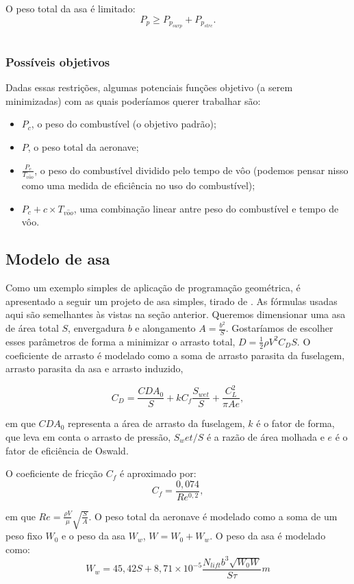 O peso total da asa é limitado:
\[
  P_p \geq P_{p_{surp}} + P_{p_{strc}}.
\]

\inputminted{python}{../Exemplos/Cap15/prog4_wwb.py}

\subsubsection{Possíveis objetivos}

Dadas essas restrições, algumas potenciais funções objetivo (a serem
minimizadas) com as quais poderíamos querer trabalhar são:

\begin{itemize}
\item $P_c$, o peso do combustível (o objetivo padrão);
\item $P$, o peso total da aeronave;
\item $\frac{P_c}{T_{v\hat{o}o}}$, o peso do combustível dividido pelo
  tempo de vôo (podemos pensar nisso como uma medida de eficiência no
  uso do combustível);
\item $P_c + c \times T_{v\hat{o}o}$, uma combinação linear antre peso
  do combustível e tempo de vôo.
\end{itemize}

\subsection{Modelo de asa}
Como um exemplo simples de aplicação de programação geométrica, é
apresentado a seguir um projeto de asa simples, tirado de
\cite{warren}. As fórmulas usadas aqui são semelhantes às vistas na
seção anterior.  Queremos dimensionar uma asa de área total $S$,
envergadura $b$ e alongamento $A = \frac{b^2}{S}$. Gostaríamos de
escolher esses parâmetros de forma a minimizar o arrasto total, $D =
\frac{1}{2}\rho V^2 C_D S$.  O coeficiente de arrasto é modelado como
a soma de arrasto parasita da fuselagem, arrasto parasita da asa e
arrasto induzido,

\[
  C_D = \frac{CDA_0}{S} + kC_f \frac{S_{wet}}{S} + \frac{C_{L}^2}{\pi A
    e},
\]

\noindent em que $CDA_0$ representa a área de arrasto da fuselagem,
$k$ é o fator de forma, que leva em conta o arrasto de pressão,
$S_wet/S$ é a razão de área molhada e $e$ é o fator de eficiência de
Oswald.

O coeficiente de fricção $C_f$ é aproximado por:
\[
  C_f = \frac{0,074}{Re^{0,2}},
\]

\noindent em que $Re = \frac{\rho V}{\mu} \sqrt{\frac{S}{A}}$. O peso
total da aeronave é modelado como a soma de um peso fixo $W_0$ e o
peso da asa $W_w$, $W = W_0 + W_w$. O peso da asa é modelado como:
\[
  W_w = 45,42S + 8,71\times10^{-5} \frac{N_{lift}b^3\sqrt{W_0W}}{S\tau}m
\]

